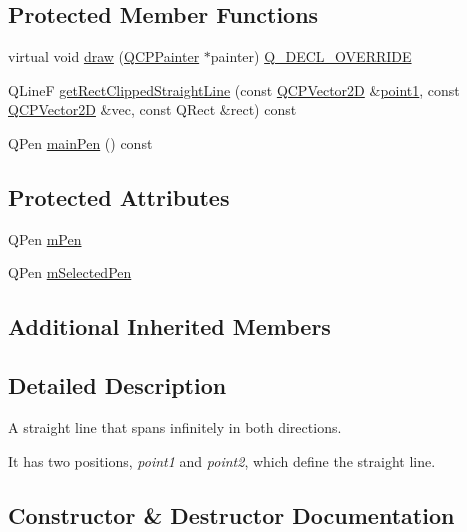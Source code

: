 \subsection*{Protected Member Functions}
\begin{DoxyCompactItemize}
\item 
virtual void \mbox{\hyperlink{class_q_c_p_item_straight_line_acbc84ad219bf4845152e4e2202fcaa3c}{draw}} (\mbox{\hyperlink{class_q_c_p_painter}{Q\+C\+P\+Painter}} $\ast$painter) \mbox{\hyperlink{qcustomplot_8h_a42cc5eaeb25b85f8b52d2a4b94c56f55}{Q\+\_\+\+D\+E\+C\+L\+\_\+\+O\+V\+E\+R\+R\+I\+DE}}
\item 
Q\+LineF \mbox{\hyperlink{class_q_c_p_item_straight_line_ae1de3d4121c06e5ffea4961722a54f5e}{get\+Rect\+Clipped\+Straight\+Line}} (const \mbox{\hyperlink{class_q_c_p_vector2_d}{Q\+C\+P\+Vector2D}} \&\mbox{\hyperlink{class_q_c_p_item_straight_line_ac131a6ffe456f2cc7364dce541fe0120}{point1}}, const \mbox{\hyperlink{class_q_c_p_vector2_d}{Q\+C\+P\+Vector2D}} \&vec, const Q\+Rect \&rect) const
\item 
Q\+Pen \mbox{\hyperlink{class_q_c_p_item_straight_line_a5b1a39cfc54c3e22f65de2958d40eb59}{main\+Pen}} () const
\end{DoxyCompactItemize}
\subsection*{Protected Attributes}
\begin{DoxyCompactItemize}
\item 
Q\+Pen \mbox{\hyperlink{class_q_c_p_item_straight_line_a15106ddc2ebd73ed5c1bc57aa92bee8f}{m\+Pen}}
\item 
Q\+Pen \mbox{\hyperlink{class_q_c_p_item_straight_line_a0307a0d56a018656adbf798bc84c2a4b}{m\+Selected\+Pen}}
\end{DoxyCompactItemize}
\subsection*{Additional Inherited Members}


\subsection{Detailed Description}
A straight line that spans infinitely in both directions. 

 It has two positions, {\itshape point1} and {\itshape point2}, which define the straight line. 

\subsection{Constructor \& Destructor Documentation}
\mbox{\label{class_q_c_p_item_straight_line_a41fd2e1f006983449eca9830930c3b10}} 
